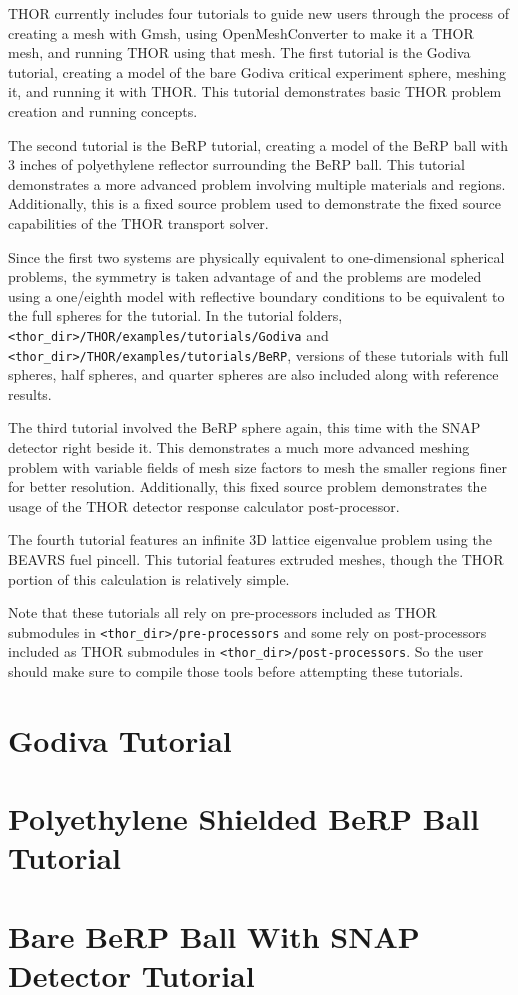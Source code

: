 \ac{THOR} currently includes four tutorials to guide new users through the process of creating a mesh with Gmsh, using OpenMeshConverter to make it a \ac{THOR} mesh, and running \ac{THOR} using that mesh.
The first tutorial is the Godiva tutorial, creating a model of the bare Godiva critical experiment sphere, meshing it, and running it with \ac{THOR}.
This tutorial demonstrates basic \ac{THOR} problem creation and running concepts.

The second tutorial is the BeRP tutorial, creating a model of the BeRP ball with 3 inches of polyethylene reflector surrounding the BeRP ball.
This tutorial demonstrates a more advanced problem involving multiple materials and regions.
Additionally, this is a fixed source problem used to demonstrate the fixed source capabilities of the THOR transport solver.

Since the first two systems are physically equivalent to one-dimensional spherical problems, the symmetry is taken advantage of and the problems are modeled using a one/eighth model with reflective boundary conditions to be equivalent to the full spheres for the tutorial.
In the tutorial folders, \\
\verb"<thor_dir>/THOR/examples/tutorials/Godiva" and \verb"<thor_dir>/THOR/examples/tutorials/BeRP", versions of these tutorials with full spheres, half spheres, and quarter spheres are also included along with reference results.

The third tutorial involved the BeRP sphere again, this time with the SNAP detector right beside it.
This demonstrates a much more advanced meshing problem with variable fields of mesh size factors to mesh the smaller regions finer for better resolution.
Additionally, this fixed source problem demonstrates the usage of the THOR detector response calculator post-processor.

The fourth tutorial features an infinite 3D lattice eigenvalue problem using the BEAVRS fuel pincell.
This tutorial features extruded meshes, though the THOR portion of this calculation is relatively simple.

Note that these tutorials all rely on pre-processors included as THOR submodules in \verb"<thor_dir>/pre-processors" and some rely on post-processors included as THOR submodules in \verb"<thor_dir>/post-processors".
So the user should make sure to compile those tools before attempting these tutorials.

\section{Godiva Tutorial}



\section{Polyethylene Shielded BeRP Ball Tutorial}



\section{Bare BeRP Ball With SNAP Detector Tutorial}


